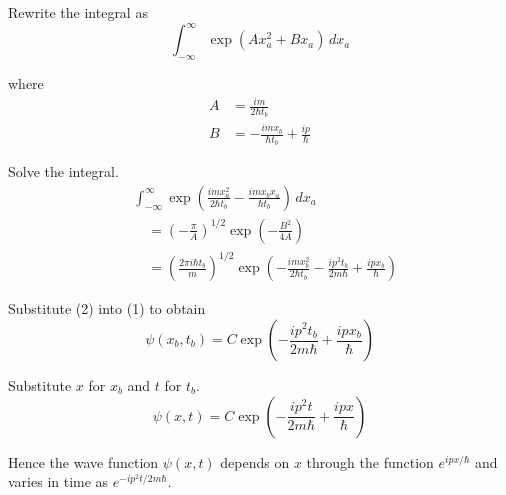 Rewrite the integral as
\begin{equation*}
\int_{-\infty}^\infty\exp(Ax_a^2+Bx_a)\,dx_a
\end{equation*}

where
\begin{align*}
A&=\frac{im}{2\hbar t_b}
\\
B&=-\frac{imx_b}{\hbar t_b}+\frac{ip}{\hbar}
\end{align*}

Solve the integral.
\begin{align*}
&\int_{-\infty}^\infty
\exp\left(\frac{imx_a^2}{2\hbar t_b}-\frac{imx_bx_a}{\hbar t_b}\right)\,dx_a
\\
&\quad{}=\left(-\frac{\pi}{A}\right)^{1/2}\exp\left(-\frac{B^2}{4A}\right)
\\
&\quad{}=\left(\frac{2\pi i\hbar t_b}{m}\right)^{1/2}
\exp\left(-\frac{i m x_b^2}{2\hbar t_b}-\frac{ip^2t_b}{2m\hbar}+\frac{ipx_b}{\hbar}\right)
\tag{2}
\end{align*}

Substitute (2) into (1) to obtain
\begin{equation*}
\psi(x_b,t_b)
=C\exp\left(-\frac{ip^2t_b}{2m\hbar}+\frac{ipx_b}{\hbar}\right)
\end{equation*}

Substitute $x$ for $x_b$ and $t$ for $t_b$.
\begin{equation*}
\psi(x,t)
=C\exp\left(-\frac{ip^2t}{2m\hbar}+\frac{ipx}{\hbar}\right)
\end{equation*}

Hence the wave function $\psi(x,t)$ depends on $x$ through the
function $e^{ipx/\hbar}$ and varies in time as
$e^{-ip^2t/2m\hbar}$.


